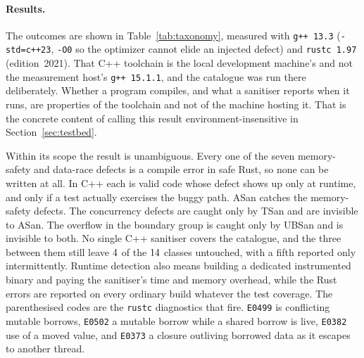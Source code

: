 \documentclass[english,oneside,a4paper,censored,csm,software-track-2020]{HYthesisML}
\begin{document}
\paragraph{Results.}
The outcomes are shown in Table~\ref{tab:taxonomy}, measured with \texttt{g++~13.3}
(\texttt{-std=c++23}, \texttt{-O0} so the optimizer cannot elide an injected defect) and
\texttt{rustc~1.97} (edition~2021). That C++ toolchain is the local development machine's
and not the measurement host's \texttt{g++~15.1.1}, and the catalogue was run there
deliberately. Whether a program compiles, and what a sanitiser reports when it runs, are
properties of the toolchain and not of the machine hosting it. That is the concrete
content of calling this result environment-insensitive in
Section~\ref{sec:testbed}.

Within its scope the result is unambiguous. Every one of
the seven memory-safety and data-race defects is a compile error in safe Rust, so none can be
written at all. In C++ each is valid code whose defect shows up only at runtime, and
only if a test actually exercises the buggy path. ASan catches the memory-safety defects. The
concurrency defects are caught only by TSan and are invisible to ASan. The overflow in the
boundary group is caught only by UBSan and is invisible to both. No single C++ sanitiser covers
the catalogue, and the three between them still leave $4$ of the
$14$ classes untouched, with a fifth reported only intermittently.
Runtime detection also means building a
dedicated instrumented binary and paying the sanitiser's time and memory overhead, while the
Rust errors are reported on every ordinary build whatever the test coverage. The parenthesised
codes are the \texttt{rustc} diagnostics that fire. \texttt{E0499} is conflicting mutable
borrows, \texttt{E0502} a mutable borrow while a shared borrow is live, \texttt{E0382} use of a
moved value, and \texttt{E0373} a closure outliving borrowed data as it escapes to another
thread.
\end{document}
